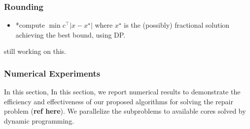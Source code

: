 \documentclass[../main]{subfiles}
\begin{document}
\hypertarget{rounding}{%
  \subsubsection{Rounding}\label{rounding}}

\begin{itemize}
  \tightlist
  \item
        *compute \(\min c ^\top | x - x^\star|\) where \(x^\star\) is the
        (possibly) fractional solution achieving the best bound, using DP.
\end{itemize}

still working on this.

\hypertarget{numerical-experiments}{%
  \subsubsection{Numerical Experiments}\label{numerical-experiments}}

In this section, In this section, we report numerical results to
demonstrate the efficiency and effectiveness of our proposed algorithms
for solving the repair problem (\textbf{ref here}). We parallelize the
subproblems to available cores solved by dynamic programming.
\end{document}
